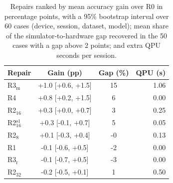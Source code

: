 \begin{table}[t]
\centering
\caption{Repairs ranked by mean accuracy gain over R0 in percentage points, with a 95\% bootstrap interval over 60 cases (device, session, dataset, model); mean share of the simulator-to-hardware gap recovered in the 50 cases with a gap above 2 points; and extra QPU seconds per session.}
\label{tab:repairs}
\footnotesize
\setlength{\tabcolsep}{3.5pt}
\begin{tabular}{lccr}
\toprule
Repair & Gain (pp) & Gap (\%) & QPU (s) \\
\midrule
R3$_{\mathrm{m}}$ & +1.0 [+0.6, +1.5] & 15 & 1.06 \\
R4 & +0.8 [+0.2, +1.5] & 6 & 0.00 \\
R2$_{16}$ & +0.3 [+0.0, +0.7] & 3 & 0.25 \\
R2$_{16}^{\mathrm{s1}}$ & +0.3 [-0.1, +0.7] & 5 & 0.05 \\
R2$_{8}$ & +0.1 [-0.3, +0.4] & -0 & 0.13 \\
R1 & -0.1 [-0.6, +0.5] & -2 & 0.00 \\
R3$_{\mathrm{r}}$ & -0.1 [-0.7, +0.5] & -3 & 0.00 \\
R2$_{32}$ & -0.2 [-0.5, +0.1] & 1 & 0.50 \\
\bottomrule
\end{tabular}
\end{table}
